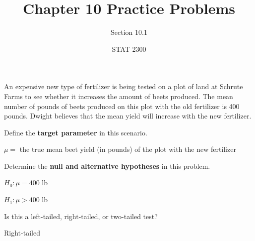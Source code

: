 \documentclass[noanswers]{exam}
\title{Chapter 10 Practice Problems}
\author{Section 10.1}
\date{STAT 2300}
\begin{document}
%

\noindent An expensive new type of fertilizer is being tested on a plot of land at Schrute Farms to see whether it increases the amount of beets produced. The mean number of pounds of beets produced on this plot with the old fertilizer is 400 pounds. Dwight believes that the mean yield will increase with the new fertilizer.

\begin{questions} 

\vspace{1mm}

\question Define the \textbf{target parameter} in this scenario.

\begin{solution}[\stretch{1}]

\vspace{1mm}

$\mu=$ the true mean beet yield (in pounds) of the plot with the new fertilizer

\vspace{1mm}

\end{solution}

\question Determine the \textbf{null and alternative hypotheses} in this problem.

\begin{solution}[\stretch{1}]

\vspace{1mm}

$H_0:\mu=400$ lb

$H_1:\mu>400$ lb

\vspace{1mm}

\end{solution}

\question Is this a left-tailed, right-tailed, or two-tailed test?

\begin{solution}[\stretch{1}]

\vspace{1mm}

Right-tailed

\vspace{1mm}

\end{solution}


\end{questions}
\end{document}
